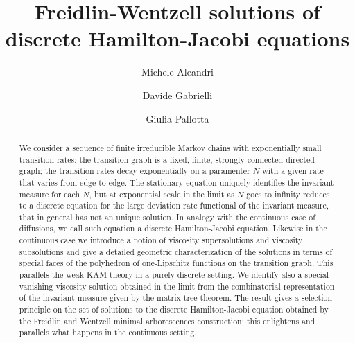 \documentclass[reqno]{amsart}
\theoremstyle{plain}
\theoremstyle{definition}
\theoremstyle{remark}
\numberwithin{equation}{section}
\numberwithin{theorem}{section}
\newcommand{\<}{\langle}
\renewcommand{\>}{\rangle}
\begin{document}
\title{Freidlin-Wentzell solutions of discrete Hamilton-Jacobi equations} %

\author{Michele Aleandri}
\address{\noindent Michele Aleandri \hfill\break\indent 
	DEF, LUISS University
	\hfill\break{} viale Romania, Roma,  Italy
}


\author{Davide Gabrielli}
\address{\noindent Davide Gabrielli \hfill\break\indent 
	DISIM, Universit\`a dell'Aquila
	\hfill\break{} Coppito, L'Aquila, Italy
}

\author{Giulia Pallotta}
\address{\noindent Giulia Pallotta \hfill\break\indent 
	DISIM, Universit\`a dell'Aquila
	\hfill\break{} Coppito, L'Aquila, Italy
}

\begin{abstract}
	We consider a sequence of finite irreducible Markov chains with exponentially small transition rates: the transition graph is a fixed, finite, strongly connected directed graph; the transition rates decay exponentially on a paramenter $N$ with a given rate that varies from edge to edge. The stationary equation uniquely identifies the invariant measure for each $N$, but at exponential scale in the limit as  $N$ goes to infinity reduces to a discrete equation for the large deviation rate functional of the invariant measure, that in general has not an unique solution. In analogy with the continuous case of diffusions, we call such equation a discrete Hamilton-Jacobi equation. Likewise in the continuous case we introduce a notion of viscosity supersolutions and viscosity subsolutions and give a detailed geometric characterization of the solutions in terms of special faces of the polyhedron of one-Lipschitz functions on the transition graph. This parallels the weak KAM theory in a purely discrete setting. We identify also a special vanishing viscosity solution obtained in the limit from the combinatorial representation of the invariant measure given by the matrix tree theorem. The result gives a selection principle on the set of solutions to the discrete Hamilton-Jacobi equation obtained by the Freidlin and Wentzell minimal arborescences construction; this enlightens and parallels what happens in the continuous setting.
\end{abstract}	

\noindent
{}
\end{document}

